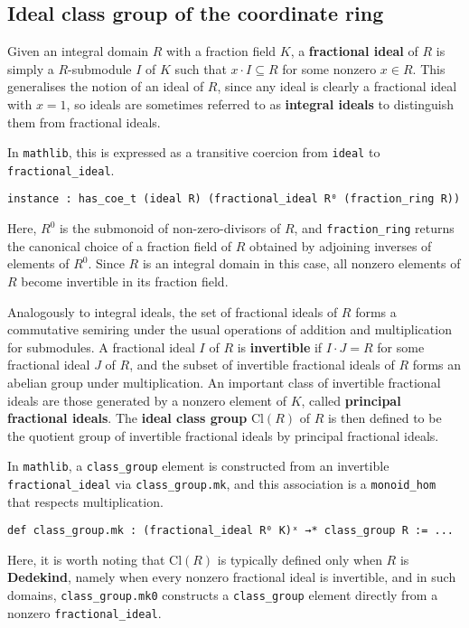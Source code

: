 \documentclass[a4paper,UKenglish,cleveref,autoref,thm-restate]{lipics-v2021}
\begin{document}
\subsection{Ideal class group of the coordinate ring}

Given an integral domain $ R $ with a fraction field $ K $, a \textbf{fractional ideal} of $ R $ is simply a $ R $-submodule $ I $ of $ K $ such that $ x \cdot I \subseteq R $ for some nonzero $ x \in R $. This generalises the notion of an ideal of $ R $, since any ideal is clearly a fractional ideal with $ x = 1 $, so ideals are sometimes referred to as \textbf{integral ideals} to distinguish them from fractional ideals.

In \texttt{mathlib}, this is expressed as a transitive coercion from \texttt{ideal} to \texttt{fractional\_ideal}.
\begin{lstlisting}
instance : has_coe_t (ideal R) (fractional_ideal R⁰ (fraction_ring R))
\end{lstlisting}
Here, $ R^0 $ is the submonoid of non-zero-divisors of $ R $, and \texttt{fraction\_ring} returns the canonical choice of a fraction field of $ R $ obtained by adjoining inverses of elements of $ R^0 $. Since $ R $ is an integral domain in this case, all nonzero elements of $ R $ become invertible in its fraction field.

Analogously to integral ideals, the set of fractional ideals of $ R $ forms a commutative semiring under the usual operations of addition and multiplication for submodules. A fractional ideal $ I $ of $ R $ is \textbf{invertible} if $ I \cdot J = R $ for some fractional ideal $ J $ of $ R $, and the subset of invertible fractional ideals of $ R $ forms an abelian group under multiplication. An important class of invertible fractional ideals are those generated by a nonzero element of $ K $, called \textbf{principal fractional ideals}. The \textbf{ideal class group} $ \mathrm{Cl}(R) $ of $ R $ is then defined to be the quotient group of invertible fractional ideals by principal fractional ideals.

\pagebreak

In \texttt{mathlib}, a \texttt{class\_group} element is constructed from an invertible \texttt{fractional\_ideal} via \texttt{class\_group.mk}, and this association is a \texttt{monoid\_hom} that respects multiplication.
\begin{lstlisting}
def class_group.mk : (fractional_ideal R⁰ K)ˣ →* class_group R := ...
\end{lstlisting}
Here, it is worth noting that $ \mathrm{Cl}(R) $ is typically defined only when $ R $ is \textbf{Dedekind}, namely when every nonzero fractional ideal is invertible, and in such domains, \texttt{class\_group.mk0} constructs a \texttt{class\_group} element directly from a nonzero \texttt{fractional\_ideal}.
\end{document}
